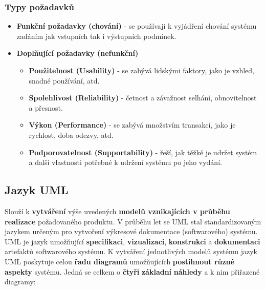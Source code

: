 \subsubsection{Typy požadavků}
\begin{itemize}
\item \textbf{Funkční požadavky (chování)} - se používají k vyjádření chování systému zadáním jak vstupních tak i výstupních podmínek.
\item \textbf{Doplňující požadavky (nefunkční)}
\begin{itemize}
\item \textbf{Použitelnost (Usability)} - se zabývá lidskými faktory, jako je vzhled, snadné používání, atd.
\item \textbf{Spolehlivost (Reliability)} -  četnost a závažnost selhání, obnovitelnost a přesnost.
\item \textbf{Výkon (Performance)} - se zabývá množstvím transakcí, jako je rychlost, doba odezvy, atd.
\item \textbf{Podporovatelnost (Supportability)} - řeší, jak těžké je udržet systém a další vlastnosti potřebné k udržení systému po jeho vydání.
\end{itemize}
\end{itemize}

\subsection{Jazyk UML}
Slouží k \textbf{vytváření} výše uvedených \textbf{modelů vznikajících v průběhu realizace} požadovaného produktu.  V průběhu let se UML stal standardizovaným jazykem určeným pro vytvoření výkresové dokumentace (softwarového) systému. UML je jazyk umožňující \textbf{specifikaci}, \textbf{vizualizaci}, \textbf{konstrukci} a \textbf{dokumentaci} artefaktů softwarového systému. K vytváření jednotlivých modelů systému jazyk UML poskytuje celou \textbf{řadu diagramů} umožňujících \textbf{postihnout různé aspekty} systému. Jedná se celkem o \textbf{čtyři} \textbf{základní} \textbf{náhledy} a k nim přiřazené diagramy:


